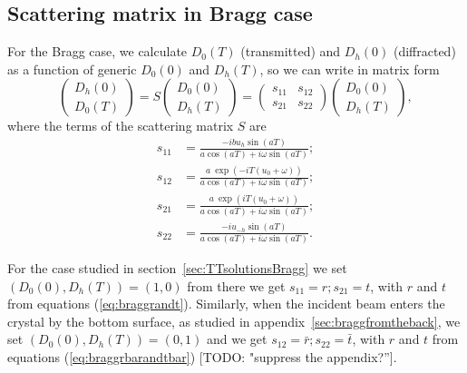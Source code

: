 \documentclass[preprint]{iucr}              %
\newcommand{\todo}[1]{{\color{red}[TODO: "#1'']}}
\begin{document}
\subsection{Scattering matrix in Bragg case}
For the Bragg case, we calculate $D_0(T)$ (transmitted) and $D_h(0)$ (diffracted) as a function of generic $D_0(0)$ and $D_h(T)$, so we can write in matrix form
\begin{equation}
    \begin{pmatrix}
    D_h(0)\\
    D_0(T)
    \end{pmatrix}
    =
    S
        \begin{pmatrix}
    D_0(0) \\
    D_h(T)
    \end{pmatrix}
    =
    \begin{pmatrix}
    s_{11} & s_{12}\\
    s_{21} & s_{22}
    \end{pmatrix}
    \begin{pmatrix}
    D_0(0) \\
    D_h(T)
    \end{pmatrix},
\end{equation}
where the terms of the scattering matrix $S$ are 
\begin{subequations}\label{eq:scatteringMatrixBragg }
\begin{align}
s_{11} &= \frac{-i b u_h \sin(a T)}{a \cos(a T) + i \omega \sin(a T)};\\
s_{12} &= \frac{a~\exp(-i T (u_0+ \omega))}{a \cos(a T) + i \omega \sin(a T)};\\
s_{21} &= \frac{a~\exp(i T (u_0+ \omega))}{a \cos(a T) + i \omega \sin(a T)};\\
s_{22} &= \frac{-i u_{-h} \sin(a T)}{a \cos(a T) + i \omega \sin(a T)}.
\end{align}
\end{subequations}


For the case studied in section~\ref{sec:TTsolutionsBragg} we set $(D_0(0),D_h(T))=(1,0)$ from there we get $s_{11}=r; s_{21}=t$, with $r$ and $t$ from equations (\ref{eq:braggrandt}). Similarly, when the incident beam enters the crystal by the bottom surface, as studied in appendix~\ref{sec:braggfromtheback}, we set $(D_0(0),D_h(T))=(0,1)$ and  we get $s_{12}=\bar{r}; s_{22}=\bar{t}$, with $r$ and $t$ from equations (\ref{eq:braggrbarandtbar}) \todo{suppress the appendix?}.
\end{document}
